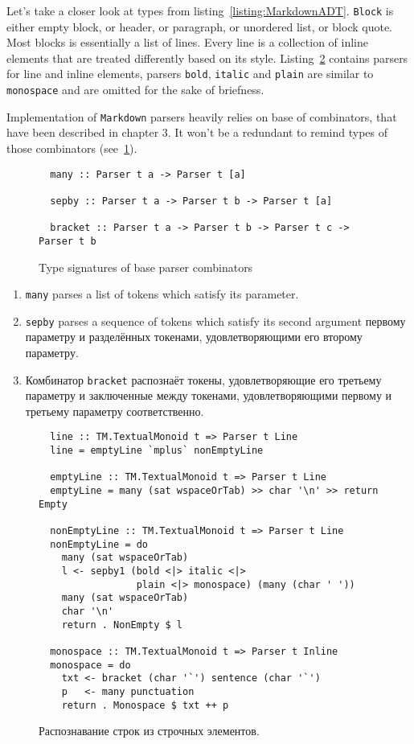   Let's take a closer look at types from listing~\ref{listing:MarkdownADT}.
  \lstinline{Block} is either empty block, or header, or paragraph, or
  unordered list, or block quote. Most blocks is essentially a list of lines.
  Every line is a collection of inline elements that are treated differently 
  based on its style. Listing~\ref{listing:MarkdownInline} contains parsers for 
  line and inline elements, parsers \lstinline{bold}, \lstinline{italic} and 
  \lstinline{plain} are similar to \lstinline{monospace} and are omitted for 
  the sake of briefness.

  Implementation of \lstinline{Markdown} parsers heavily relies on base of 
  combinators, that have been described in chapter 3. It won't be a redundant to
  remind types of those combinators (see~\ref{listing:ParserCombinators}).   

  \begin{figure}[h]
  \begin{lstlisting}
  many :: Parser t a -> Parser t [a]

  sepby :: Parser t a -> Parser t b -> Parser t [a]

  bracket :: Parser t a -> Parser t b -> Parser t c -> Parser t b
  \end{lstlisting}
  \caption{Type signatures of base parser combinators}
  \label{listing:ParserCombinators}
  \end{figure}

  \begin{enumerate}
    \item \lstinline{many} parses a list of tokens which satisfy its parameter.
    \item \lstinline{sepby} parses a sequence of tokens which satisfy its second 
    argument первому параметру и разделённых токенами, удовлетворяющими
    его второму параметру.
    \item Комбинатор \lstinline{bracket} распознаёт токены, удовлетворяющие его
    третьему параметру и заключенные между токенами, удовлетворяющими первому и
    третьему параметру соответственно.
  \end{enumerate}

  \begin{figure}[t]
  \begin{lstlisting}
  line :: TM.TextualMonoid t => Parser t Line
  line = emptyLine `mplus` nonEmptyLine

  emptyLine :: TM.TextualMonoid t => Parser t Line
  emptyLine = many (sat wspaceOrTab) >> char '\n' >> return Empty

  nonEmptyLine :: TM.TextualMonoid t => Parser t Line
  nonEmptyLine = do
    many (sat wspaceOrTab)
    l <- sepby1 (bold <|> italic <|>
                 plain <|> monospace) (many (char ' '))
    many (sat wspaceOrTab)
    char '\n'
    return . NonEmpty $ l

  monospace :: TM.TextualMonoid t => Parser t Inline
  monospace = do
    txt <- bracket (char '`') sentence (char '`')
    p   <- many punctuation
    return . Monospace $ txt ++ p
  \end{lstlisting}
  \caption{Распознавание строк из строчных элементов.}
  \label{listing:MarkdownInline}
  \end{figure}

